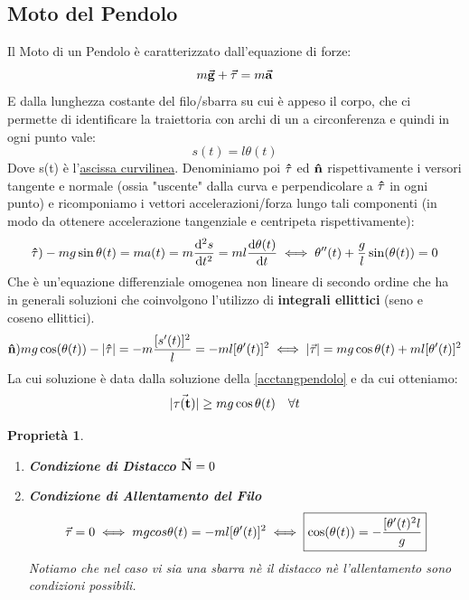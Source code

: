 \documentclass{article}
\newtheorem{property}{Proprietà}[section]
\renewcommand{\a}{\va{a}}
\newcommand{\normvs}{\vu{n}}
\newcommand{\N}{\va{N}}
\newcommand{\normvt}{\N}
\newcommand{\g}{\va{g}}
\begin{document}
\subsection{Moto del Pendolo}
Il Moto di un Pendolo è caratterizzato dall'equazione di forze:
\[m\g+\va{\tau}=m\a\]
E dalla lunghezza costante del filo/sbarra su cui è appeso il corpo, che ci permette di identificare la traiettoria con archi di un a circonferenza e quindi in ogni punto vale:
\[s(t)=l\theta(t)\]
Dove s(t) è l'\hyperlink{ascissacurv}{ascissa curvilinea}. Denominiamo poi $\vu{\tau}$ ed $\normvs$ rispettivamente i versori tangente e normale (ossia "uscente" dalla curva e perpendicolare a $\vu{\tau}$ in ogni punto) e ricomponiamo i vettori accelerazioni/forza lungo tali componenti (in modo da ottenere accelerazione tangenziale e centripeta rispettivamente):
\begin{equation}
\label{acctangpendolo}
\vu{\tau}) -mg\sin\theta(t)=ma(t)=m\dv[2]{s}{t}=ml\dv{\theta(t)}{t}\iff \theta''(t)+\frac{g}{l}\sin(\theta(t))=0
\end{equation}
Che è un'equazione differenziale omogenea non lineare di secondo ordine che ha in generali soluzioni che coinvolgono l'utilizzo di \textbf{integrali ellittici} (seno e coseno ellittici). 
\begin{equation}
\label{acccentrpendolo}
\normvs) mg\cos(\theta(t))-|\vu{\tau}|= -m\frac{[s'(t)]^2}{l}=-ml[\theta'(t)]^2 \iff |\va{\tau}|=mg\cos\theta(t)+ml[\theta'(t)]^2   
\end{equation}
La cui soluzione è data dalla soluzione della \ref{acctangpendolo} e da cui otteniamo:
\begin{equation}
|\va{\tau(t)}|\geq mg\cos\theta(t)\quad\forall t
\end{equation}


\begin{property}
\begin{enumerate}
    \item \textbf{Condizione di Distacco} \(\normvt=0\)
    \item \textbf{Condizione di Allentamento del Filo}
    \[\va{\tau}=0\iff mgcos\theta(t)=-ml[\theta'(t)]^2\iff \boxed{\cos(\theta(t))=-\frac{[\theta'(t)^2l}{g}}\]
    Notiamo che nel caso vi sia una sbarra nè il distacco nè l'allentamento sono condizioni possibili. 
\end{enumerate}
\end{property}
\end{document}
